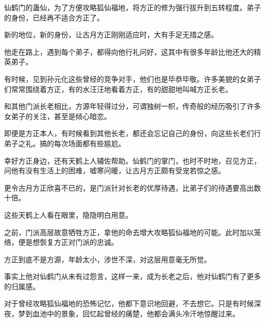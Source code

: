 \begin{this_body}
仙鹤门的蛊仙，为了方便攻略狐仙福地，将方正的修为强行拔升到五转程度。弟子的身份，已经再不适合方正了。

新的地位，新的身份，让古月方正刚刚适应时，大有手足无措之感。

他走在路上，遇到每个弟子，都得向他行礼问好，这其中有很多年龄比他还大的精英弟子。

有时候，见到孙元化这些曾经的竞争对手，他们也是毕恭毕敬。许多美貌的女弟子们常常围绕着方正，有的水汪汪地看着方正，有的甜甜地叫喊方正长老。

和其他门派长老相比，方源年轻得过分，可谓独树一帜，传奇般的经历吸引了许多女弟子的关注，甚至是倾心暗恋。

即便是方正本人，有时候看到其他长老，都还会忘记自己的身份，向这些长老们行弟子之礼。搞的每次场面都有些尴尬。

幸好方正身边，还有天鹤上人辅佐帮助。仙鹤门的掌门，也时不时地，召见方正，问他有没有生活上的困难，嘘寒问暖，让古月方正颇有受宠若惊之感。

更令古月方正欣喜不已的，是门派针对长老的优厚待遇，比弟子们的待遇要高出数十倍。

这些天鹤上人看在眼里，隐隐明白用意。

之前，门派高层故意牺牲方正，拿他的命去增大攻略狐仙福地的可能。此时加以笼络，便是想恢复方正对门派的忠诚。

方正到底不是方源，年龄太小，涉世不深，对这层用意毫无所觉。

事实上他对仙鹤门从未有过怨言，这样一来，成为长老之后，他对仙鹤门有了更多的归属感。

对于曾经攻略狐仙福地的恐怖记忆，他都下意识地回避，不去想它。只是有时候深夜，梦到血池中的景象，回忆起曾经的痛楚，他都会满头冷汗地惊醒过来。

\end{this_body}

